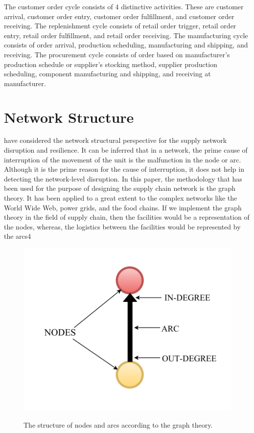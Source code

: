 The customer order cycle consists of 4 distinctive activities. These are customer arrival, customer order entry, customer order fulfillment, and customer order receiving. The replenishment cycle consists of retail order trigger, retail order entry, retail order fulfillment, and retail order receiving. The manufacturing cycle consists of order arrival, production scheduling, manufacturing and shipping, and receiving. The procurement cycle consists of order based on manufacturer's production schedule or supplier's stocking method, supplier production scheduling, component manufacturing and shipping, and receiving at manufacturer.



\newpage
\section{Network Structure}

\citep{Kim2015} have considered the network structural perspective for the supply network disruption and resilience. It can be inferred that in a network, the prime cause of interruption of the movement of the unit is the malfunction in the node or arc. Although it is the prime reason for the cause of interruption, it does not help in detecting the network-level disruption. In this paper, the methodology that has been used for the purpose of designing the supply chain network is the graph theory. It has been applied to a great extent to the complex networks like the World Wide Web, power grids, and the food chains. If we implement the graph theory in the field of supply chain, then the facilities would be a representation of the nodes, whereas, the logistics between the facilities would be represented by the arcs4

\begin{figure}[H]
  \centering
  \includegraphics[width=4.5in]{figures/pdf/Node-structure.png}\\
  \caption{The structure of nodes and arcs according to the graph theory.}\label{Node structure}
\end{figure}


